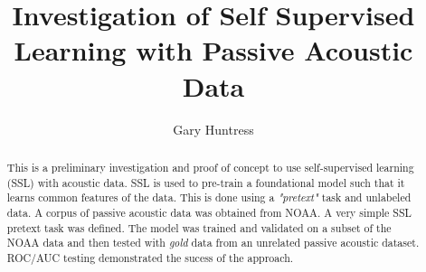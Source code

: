 \documentclass{article}
\title{Investigation of Self Supervised Learning with Passive Acoustic Data}
\author{Gary Huntress}
\affil{NUWCDIVNPT, Code 4542}
\begin{document}
\maketitle
\begin{abstract}
This is a preliminary investigation and proof of concept to use self-supervised learning (SSL) with acoustic data.  SSL is used to pre-train a foundational model such that it learns common features of the data.  This is done using a \textit{"pretext"} task and unlabeled data.  A corpus of passive acoustic data was obtained from NOAA.  A very simple SSL pretext task was defined.  The model was trained and validated on a subset of the NOAA data and then tested with \textit{gold} data from an unrelated passive acoustic dataset.  ROC/AUC testing demonstrated the sucess of the approach.  


\end{abstract}
 
\end{document}
